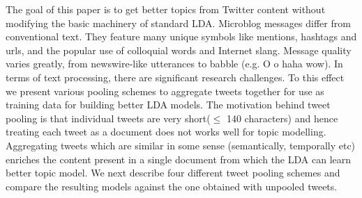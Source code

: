 \documentclass[10pt,a5paper,twoside]{article}
\begin{document}

The goal of this paper is to get better topics from Twitter content without modifying the basic machinery of standard LDA. Microblog messages differ from conventional text. They feature many unique symbols like mentions, hashtags and urls, and the popular use of colloquial words and Internet slang. Message quality varies greatly, from newswire-like utterances  to babble (e.g. O o haha wow). In terms of text processing, there are significant research challenges. To this effect we present various pooling schemes to aggregate tweets together for use as training data for building better LDA models. The motivation behind tweet pooling is that individual tweets are very short($\leq$ 140 characters) and hence treating each tweet as a document does not works well for topic modelling. Aggregating tweets which are similar in some sense (semantically, temporally etc) enriches the content present in a single document from which the LDA can learn better topic model. We next describe four different tweet pooling schemes and compare the resulting models against the one obtained with unpooled tweets.
\end{document}
